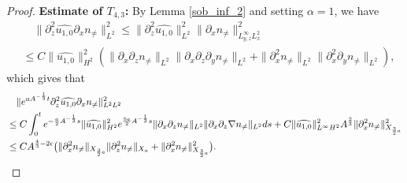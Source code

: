 \documentclass[12pt, reqno]{amsart}
\numberwithin{equation}{section}
\begin{document}
\begin{proof}
		
		\noindent\textbf{Estimate of $T_{4,3}$:}
		By Lemma \ref{sob_inf_2} and setting $\alpha=1$, we have 
		\begin{equation*}
			\begin{aligned}
				&\quad\|\partial_z^2\widehat{u_{1,0}}\partial_x n_{\neq}\|_{L^2}^2
				\leq \|\partial_z^2\widehat{u_{1,0}}\|_{L^2}^2
				\|\partial_x n_{\neq}\|_{L^{\infty}_{y,z}L^2_x}^2\\
				&\leq C\|\widehat{u_{1,0}}\|_{H^2}^2
				(\|\partial_x\partial_zn_{\neq}\|_{L^2}
				\|\partial_x\partial_z\partial_yn_{\neq}\|_{L^2}
				+\|\partial_x^2n_{\neq}\|_{L^2}
				\|\partial_x^2\partial_yn_{\neq}\|_{L^2}),
			\end{aligned}
		\end{equation*}
		which gives that 
		\begin{equation}\label{temp1_3}
			\begin{aligned}
				&\quad\|{\rm e}^{aA^{-\frac{1}{3}}t}
				\partial_z^2\widehat{u_{1,0}}\partial_x n_{\neq}\|_{L^2L^2}^2\\
				&\leq C\int_0^t{\rm e}^{-\frac{a}{2}A^{-\frac13}s}\|\widehat{u_{1,0}}\|^2_{H^2}
				{\rm e}^{\frac{5a}{2}A^{-\frac13}s}
				\|\partial_x\partial_z n_{\neq}\|_{L^2}
				\|\partial_x\partial_z \nabla n_{\neq}\|_{L^2}ds
				+C\|\widehat{u_{1,0}}\|^2_{L^{\infty}H^2}A^{\frac23}
				\|\partial_x^2n_{\neq}\|^2_{X_{\frac32a}}\\
				&\leq CA^{\frac{4}{3}-2\epsilon}
				\big(\|\partial_x^2n_{\neq}\|_{X_{\frac32a}}
				\|\partial_z^2n_{\neq}\|_{X_{a}}
				+\|\partial_x^2n_{\neq}\|^2_{X_{\frac32a}}\big).
			\end{aligned}
		\end{equation}
		

\end{proof}
\end{document}
